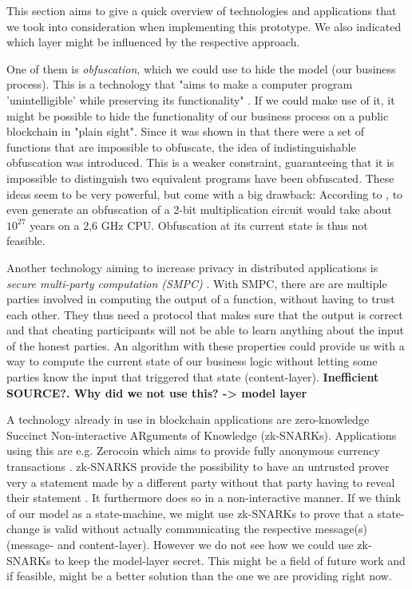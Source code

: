 \documentclass[runningheads]{llncs}
\begin{document}
This section aims to give a quick overview of technologies and applications that we took into consideration when implementing this prototype. We also indicated which layer might be influenced by the respective approach. 

One of them is \textit{obfuscation}, which we could use to hide the model (our business process). This is a technology that "aims to make a computer program 'unintelligible' while preserving its functionality" \cite{garg2016candidate}. If we could make use of it, it might be possible to hide the functionality of our business
process on a public blockchain in "plain sight". Since it was shown in \cite{barak2001possibility,barak2012possibility} that there were a set of functions that are impossible to obfuscate, the idea of indistinguishable obfuscation was
introduced. This is a weaker constraint, guaranteeing that it is impossible to distinguish two equivalent programs have
been obfuscated. These ideas seem to be very powerful, but come with a big drawback: According to \cite{banescu2015idea}, to even generate an obfuscation of a 2-bit multiplication circuit would take about $10^{27}$ years on a 2,6 GHz CPU. Obfuscation at its current state is thus not feasible. 

Another technology aiming to increase privacy in distributed applications is \textit{secure multi-party computation (SMPC)} \cite{orlandi2011multiparty}. With SMPC, there are are multiple parties involved in computing the output of a function, without having to trust each other. They thus need a protocol that makes sure that the output is correct and that cheating participants will not be able to learn anything about the input of the honest parties. An algorithm with these properties could provide us with a way to compute the current state of our business logic without letting some parties know the input that triggered that state (content-layer). \textbf{Inefficient \textbf{SOURCE?}. Why did we not use this? -> model layer}

A technology already in use in blockchain applications are zero-knowledge Succinct Non-interactive ARguments of Knowledge (zk-SNARKs). Applications using this are e.g. Zerocoin which aims to provide fully anonymous currency transactions \cite{miers2013zerocoin}. zk-SNARKS provide the possibility to have an untrusted prover very a statement made by a different party without that party having to reveal their statement \cite{ben2013snarks}. It furthermore does so in a non-interactive manner. If we think of our model as a state-machine, we might use zk-SNARKs to prove that a state-change is valid without actually communicating the respective message(s) (message- and content-layer). However we do not see how we could use zk-SNARKs to keep the model-layer secret. This might be a field of future work and if feasible, might be a better solution than the one we are providing right now. 
\end{document}
